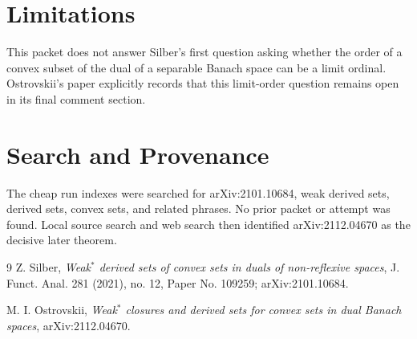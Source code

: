 \documentclass[11pt]{article}
\begin{document}
\section*{Limitations}

This packet does not answer Silber's first question asking whether the order of a convex subset of the dual of a separable Banach space can be a limit ordinal.  Ostrovskii's paper explicitly records that this limit-order question remains open in its final comment section.

\section*{Search and Provenance}

The cheap run indexes were searched for arXiv:2101.10684, weak derived sets, derived sets, convex sets, and related phrases.  No prior packet or attempt was found.  Local source search and web search then identified arXiv:2112.04670 as the decisive later theorem.

\begin{thebibliography}{9}
Z. Silber,
\emph{Weak$^*$ derived sets of convex sets in duals of non-reflexive spaces},
J. Funct. Anal. 281 (2021), no. 12, Paper No. 109259; arXiv:2101.10684.

M. I. Ostrovskii,
\emph{Weak$^*$ closures and derived sets for convex sets in dual Banach spaces},
arXiv:2112.04670.
\end{thebibliography}
\end{document}
